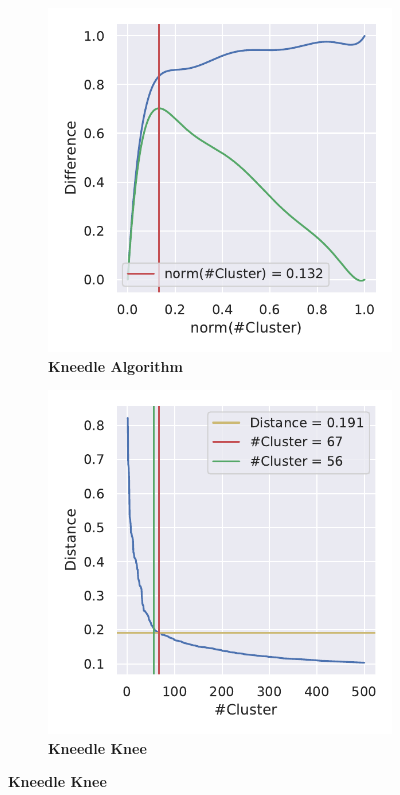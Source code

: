 \begin{figure}[!hbt]
    \centering
    \begin{subfigure}[b]{0.475\textwidth}
        \caption[Kneedle Algorithm]{\textbf{Kneedle Algorithm}}
        \label{subfig:PCA_Cluster_Knee_Kneedle_4}            \includegraphics[width=\textwidth]{PCA/Cluster_Knee_Segment_4.pdf}
    \end{subfigure}
    \hfill
    \begin{subfigure}[b]{0.475\textwidth}
        \caption[Kneedle Knee]{\textbf{Kneedle Knee}}
        \label{subfig:PCA_Cluster_Knee_Elbow_4}            \includegraphics[width=\textwidth]{PCA/Cluster_Elbow_Knee_Segment_4.pdf}

\end{subfigure}
\end{figure}
